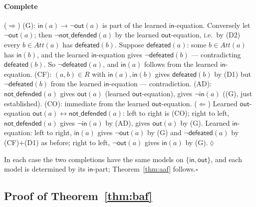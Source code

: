 \documentclass[review,12pt]{elsarticle}
\theoremstyle{definition}
\theoremstyle{remark}
\newcommand{\pred}[1]{\textsf{#1}}
\newcommand{\Att}{\mathit{Att}}
\begin{document}
\paragraph{Complete}
($\Rightarrow$) (G): $\pred{in}(a)\rightarrow\neg\pred{out}(a)$ is part of the
learned $\pred{in}$-equation. Conversely let $\neg\pred{out}(a)$; then
$\neg\pred{not\_defended}(a)$ by the learned $\pred{out}$-equation, i.e.\ by
(D2) every $b\in\Att(a)$ has $\pred{defeated}(b)$. Suppose
$\pred{defeated}(a)$: some $b\in\Att(a)$ has $\pred{in}(b)$, and the learned
$\pred{in}$-equation gives $\neg\pred{defeated}(b)$ --- contradicting
$\pred{defeated}(b)$. So $\neg\pred{defeated}(a)$, and $\pred{in}(a)$ follows
from the learned $\pred{in}$-equation. (CF): $(a,b)\in R$ with
$\pred{in}(a),\pred{in}(b)$ gives $\pred{defeated}(b)$ by (D1) but
$\neg\pred{defeated}(b)$ from the learned $\pred{in}$-equation ---
contradiction. (AD): $\pred{not\_defended}(a)$ gives $\pred{out}(a)$
(learned $\pred{out}$-equation), gives $\neg\pred{in}(a)$ ((G), just
established). (CO): immediate from the learned $\pred{out}$-equation.
($\Leftarrow$) Learned $\pred{out}$-equation
$\pred{out}(a)\leftrightarrow\pred{not\_defended}(a)$: left to right is (CO);
right to left, $\pred{not\_defended}(a)$ gives $\neg\pred{in}(a)$ by (AD),
gives $\pred{out}(a)$ by (G). Learned $\pred{in}$-equation: left to right,
$\pred{in}(a)$ gives $\neg\pred{out}(a)$ by (G) and $\neg\pred{defeated}(a)$
by (CF)+(D1) as before; right to left, $\neg\pred{out}(a)$ gives
$\pred{in}(a)$ by (G).\hfill$\lozenge$

\medskip
\noindent In each case the two completions have the same models on
$\{\pred{in},\pred{out}\}$, and each model is determined by its
$\pred{in}$-part; Theorem~\ref{thm:aaf} follows.\hfill$\square$

\subsection{Proof of Theorem~\ref{thm:baf}}
\end{document}
